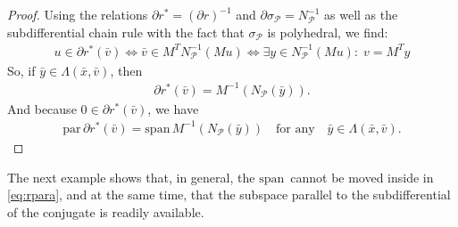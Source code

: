 \documentclass[reqno]{amsart}
\numberwithin{equation}{section}
\newcommand{\pol}{\mathcal{P}}
\newcommand{\x}{\bar{x}}
\newcommand{\para}{\mathrm{par}\,}
\newcommand{\lin}{\mathrm{span}\,}
\begin{document}
\begin{proof}
    Using the relations $\partial r^* = (\partial r)^{-1}$  and $\partial \sigma_\pol=N_\pol^{-1}$ as well as the subdifferential chain rule \cite[Theorem 23.9]{R 70} with the fact that $\sigma_\pol$ is polyhedral, we find: 
    \begin{align*}
        u \in \partial r^*(\bar v) \iff \bar v \in M^{T} N_{\pol}^{-1}(Mu) \iff \exists y \in N_{\pol}^{-1}(Mu):\; v = M^Ty
    \end{align*} So, if $\bar y \in \Lambda(\x, \bar v)$, then \begin{align*}
        \partial r^*(\bar v) = M^{-1}(N_{\pol}(\bar y)).
    \end{align*} 
    And because $0 \in \partial r^*(\bar v)$, we have
    \begin{align*}
        \para \partial r^*(\bar v) = \lin M^{-1}(N_{\pol}(\bar y))\quad\mbox{for any}\quad \bar y\in \Lambda(\bar x,\bar v).
    \end{align*}

\end{proof}


\noindent
The next example shows that, in general, the $\lin$ cannot be moved inside in \eqref{eq:rpara}, and at the same time, that the subspace parallel to the subdifferential of the conjugate is readily available.
\end{document}
